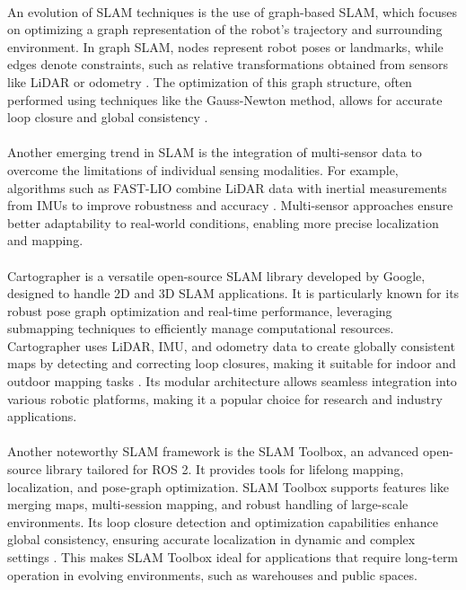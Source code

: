 \paragraph*{} An evolution of SLAM techniques is the use of graph-based SLAM, which focuses on optimizing a graph representation of the robot's trajectory and surrounding environment. In graph SLAM, nodes represent robot poses or landmarks, while edges denote constraints, such as relative transformations obtained from sensors like LiDAR or odometry \cite{grisetti2010tutorial}. The optimization of this graph structure, often performed using techniques like the Gauss-Newton method, allows for accurate loop closure and global consistency \cite{kummerle2011g2o}.

\paragraph*{} Another emerging trend in SLAM is the integration of multi-sensor data to overcome the limitations of individual sensing modalities. For example, algorithms such as FAST-LIO combine LiDAR data with inertial measurements from IMUs to improve robustness and accuracy \cite{xu2021fast}. Multi-sensor approaches ensure better adaptability to real-world conditions, enabling more precise localization and mapping.

\paragraph*{} Cartographer is a versatile open-source SLAM library developed by Google, designed to handle 2D and 3D SLAM applications. It is particularly known for its robust pose graph optimization and real-time performance, leveraging submapping techniques to efficiently manage computational resources. Cartographer uses LiDAR, IMU, and odometry data to create globally consistent maps by detecting and correcting loop closures, making it suitable for indoor and outdoor mapping tasks \cite{hess2016real}. Its modular architecture allows seamless integration into various robotic platforms, making it a popular choice for research and industry applications.

\paragraph*{} Another noteworthy SLAM framework is the SLAM Toolbox, an advanced open-source library tailored for ROS 2. It provides tools for lifelong mapping, localization, and pose-graph optimization. SLAM Toolbox supports features like merging maps, multi-session mapping, and robust handling of large-scale environments. Its loop closure detection and optimization capabilities enhance global consistency, ensuring accurate localization in dynamic and complex settings \cite{macenski2021slamtoolbox}. This makes SLAM Toolbox ideal for applications that require long-term operation in evolving environments, such as warehouses and public spaces.
